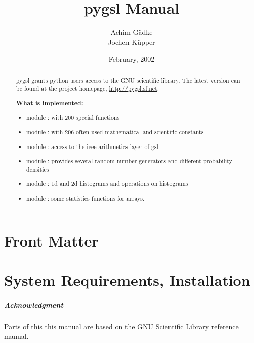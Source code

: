 \documentclass{manual}
\title{pygsl Manual}
\author{Achim G\"adke\makebox[0pt]{ \footnotemark[1]} \\
Jochen K\"upper}
\date{February, 2002}           %
\makeatletter
\let\py@OldOldChapter=\chapter
\renewcommand{\chapter}{\py@reset%
                        \py@OldOldChapter}
\newcommand{\GSL}{GNU Scientific Library}
\makeatother
\begin{document}
\maketitle

\ifhtml
\chapter*{Front Matter}
\label{front}
\fi



\begin{abstract}
   \noindent
   pygsl grants python users access to the GNU scientific library.
   The latest version can be found at the project homepage, \url{http://pygsl.sf.net}.

   {\bf What is implemented:}
   \begin{itemize}
     \item module : with 200 special functions
     \item module : with 206 often used mathematical and scientific constants
     \item module : access to the ieee-arithmetics layer of gsl
     \item module : provides several random number generators and
                                      different probability densities
     \item module : 1d and 2d histograms and operations on histograms
     \item module : some statistics functions for arrays.
\end{itemize}

\end{abstract}


\tableofcontents


\chapter{System Requirements, Installation}
\label{cha:system-req-installation}


\paragraph*{Acknowledgment}
\label{sec:acknowledgment}
Parts of this this manual are based on the \GSL{} reference manual.
\end{document}
